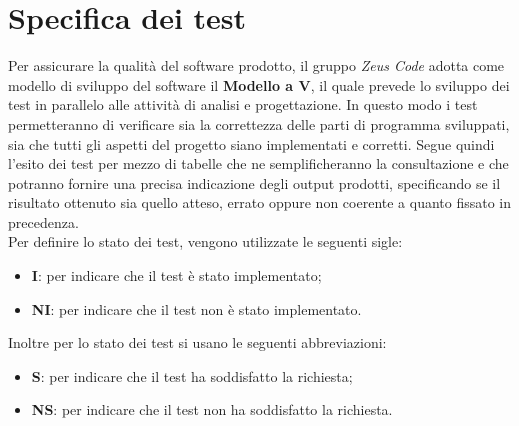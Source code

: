 \section{Specifica dei test}
Per assicurare la qualità del software prodotto, il gruppo \textit{Zeus Code} adotta come modello di sviluppo del software il
\textbf{Modello a V\glo}, il quale prevede lo sviluppo dei test in parallelo alle
attività di analisi e progettazione. In questo modo i test permetteranno di
verificare sia la correttezza delle parti di programma sviluppati, sia che
tutti gli aspetti del progetto siano implementati e corretti. 
Segue quindi l'esito dei test per mezzo di tabelle che ne
semplificheranno la consultazione e che potranno fornire una precisa indicazione 
degli output prodotti, specificando se il risultato ottenuto sia quello atteso, errato
oppure non coerente a quanto fissato in precedenza. \\
Per definire lo stato dei test, vengono utilizzate le seguenti sigle:
\begin{itemize}
	\item \textbf{I}: per indicare che il test è stato implementato;
	\item \textbf{NI}: per indicare che il test non è stato implementato.
\end{itemize}
Inoltre per lo stato dei test si usano le seguenti abbreviazioni:
\begin{itemize}
	\item \textbf{S}: per indicare che il test ha soddisfatto la richiesta;
	\item \textbf{NS}: per indicare che il test non ha soddisfatto la richiesta.
\end{itemize}
